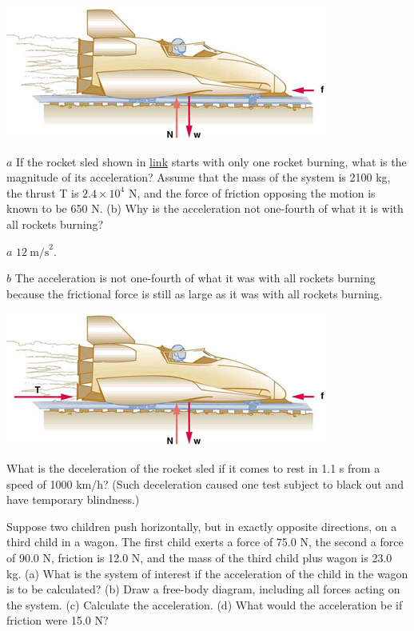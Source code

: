 \documentclass[
]{book}
\begin{document}
\includegraphics{images/Figure_04_03_07.jpg}

\hypertarget{fs-id2673239}{}
\leavevmode{}%
\(a\) If the rocket sled shown in
\protect\hyperlink{fs-id1870792}{link} starts with only one
rocket burning, what is the magnitude of its acceleration? Assume that
the mass of the system is 2100 kg, the thrust T is \(2.4 \times 10^{4}\)
N, and the force of friction opposing the motion is known to be 650 N.
(b) Why is the acceleration not one-fourth of what it is with all
rockets burning?

\leavevmode{}%
\(a\) \(12\ \text{m/s}^{2}\).

\(b\) The acceleration is not one-fourth of what it was with all rockets
burning because the frictional force is still as large as it was with
all rockets burning.

\includegraphics{images/Figure_04_03_05.jpg}

\hypertarget{fs-id2409301}{}
\leavevmode{}%
What is the deceleration of the rocket sled if it comes to rest in 1.1 s
from a speed of 1000 km/h? (Such deceleration caused one test subject to
black out and have temporary blindness.)

\hypertarget{fs-id2963161}{}
\leavevmode{}%
Suppose two children push horizontally, but in exactly opposite
directions, on a third child in a wagon. The first child exerts a force
of 75.0 N, the second a force of 90.0 N, friction is 12.0 N, and the
mass of the third child plus wagon is 23.0 kg. (a) What is the system of
interest if the acceleration of the child in the wagon is to be
calculated? (b) Draw a free-body diagram, including all forces acting on
the system. (c) Calculate the acceleration. (d) What would the
acceleration be if friction were 15.0 N?
\end{document}

